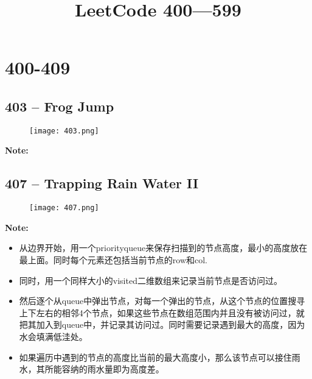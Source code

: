 \documentclass[a4paper,12pt]{article}
\title{LeetCode 400---599}
\begin{document}
	\maketitle
\section{400-409}

\subsection{403 -- Frog Jump}
\begin{figure}[H]
	\begin{center}
		\texttt{[image: 403.png]}
	\end{center}
\end{figure}
\textbf{\large{Note:}}
\begin{CJK*}{UTF8}{gbsn}

	\clearpage
\end{CJK*}






\subsection{407 -- Trapping Rain Water II}
	\begin{figure}[H]
		\begin{center}
		\texttt{[image: 407.png]}
		\end{center}
	\end{figure}
	\textbf{\large{Note:}}
	\begin{CJK*}{UTF8}{gbsn}
	\begin{itemize}
		\item 从边界开始，用一个priority\textunderscore queue来保存扫描到的节点高度，最小的高度放在最上面。同时每个元素还包括当前节点的row和col.
		\item 同时，用一个同样大小的visited二维数组来记录当前节点是否访问过。
		\item 然后逐个从queue中弹出节点，对每一个弹出的节点，从这个节点的位置搜寻上下左右的相邻4个节点，如果这些节点在数组范围内并且没有被访问过，就把其加入到queue中，并记录其访问过。同时需要记录遇到最大的高度，因为水会填满低洼处。
		\item 如果遍历中遇到的节点的高度比当前的最大高度小，那么该节点可以接住雨水，其所能容纳的雨水量即为高度差。
	\end{itemize}
	\clearpage
	\end{CJK*}
\end{document}
